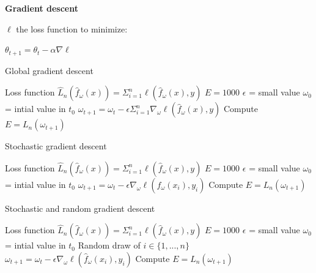 {\fontsize{12pt}{22pt} \textbf{Gradient descent}\par}

\vspace{5mm}

$\ell$ the loss function to minimize:

$\theta_{t+1}=\theta_t - \alpha \nabla \ell$ \\

\begin{algorithm}
\caption{Global gradient descent}
\begin{algorithmic}
\State Loss function $\widehat{L}_n(\hat{f}_\omega(x))=\Sigma_{i=1}^n \mathcal{\ell}(\hat{f}_\omega(x),y)$
\State $E=1000$
\State $\epsilon$ = small value
\State $\omega_0$ = intial value in $t_0$
\State $\omega_{t+1}=\omega_t-\epsilon\Sigma_{i=1}^n\nabla_\omega{\mathcal{\ell}(\hat{f}_\omega(x),y)}$
\State Compute $E=L_n(\omega_{t+1})$
\EndWhile
\end{algorithmic}
\end{algorithm}


\begin{algorithm}
\caption{Stochastic gradient descent}
\begin{algorithmic}
\State Loss function $\widehat{L}_n(\hat{f}_\omega(x))=\Sigma_{i=1}^n \mathcal{\ell}(\hat{f}_\omega(x),y)$
\State $E=1000$
\State $\epsilon$ = small value
\State $\omega_0$ = intial value in $t_0$
\State $\omega_{t+1}=\omega_t-\epsilon\nabla_\omega{\mathcal{\ell}(\hat{f}_\omega(x_i),y_i)}$
\EndFor
\State Compute $E=L_n(\omega_{t+1})$
\EndWhile
\end{algorithmic}
\end{algorithm}

\begin{algorithm}
\caption{Stochastic and random gradient descent}
\begin{algorithmic}
\State Loss function $\widehat{L}_n(\hat{f}_\omega(x))=\Sigma_{i=1}^n \mathcal{\ell}(\hat{f}_\omega(x),y)$
\State $E=1000$
\State $\epsilon$ = small value
\State $\omega_0$ = intial value in $t_0$
\State Random draw of $i \in \{1,...,n\}$
\State $\omega_{t+1}=\omega_t-\epsilon\nabla_\omega{\mathcal{\ell}(\hat{f}_\omega(x_i),y_i)}$
\EndFor
\State Compute $E=L_n(\omega_{t+1})$
\EndWhile
\end{algorithmic}
\end{algorithm}

\vspace{30mm}

